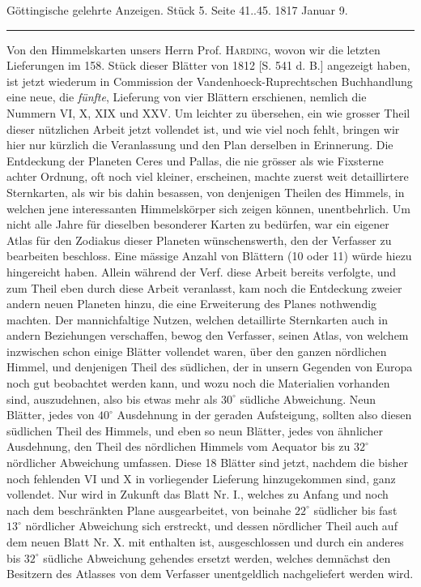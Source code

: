 \clearpage
{}
\hypertarget{native-598-lower}{}
\begin{center}\small Göttingische gelehrte Anzeigen. Stück 5. Seite 41..45. 1817 Januar 9.\\[3pt]\rule{.72\linewidth}{.3pt}\end{center}

Von den Himmelskarten unsers Herrn Prof. \textsc{Harding}, wovon wir die letzten Lieferungen im 158. Stück dieser Blätter von 1812 [S. 541 d. B.] angezeigt haben, ist jetzt wiederum in Commission der Vandenhoeck-Ruprechtschen Buchhandlung eine neue, die \emph{fünfte}, Lieferung von vier Blättern erschienen, nemlich die Nummern VI, X, XIX und XXV. Um leichter zu übersehen, ein wie grosser Theil dieser nützlichen Arbeit jetzt vollendet ist, und wie viel noch fehlt, bringen wir hier nur kürzlich die Veranlassung und den Plan derselben in Erinnerung. Die Entdeckung der Planeten Ceres und Pallas, die nie grösser als wie Fixsterne achter Ordnung, oft noch viel kleiner, erscheinen, machte zuerst weit detaillirtere Sternkarten, als wir bis dahin besassen, von denjenigen Theilen des Himmels, in welchen jene interessanten Himmelskörper sich zeigen können, unentbehrlich. Um nicht alle Jahre für dieselben besonderer Karten zu bedürfen, war ein eigener Atlas für den Zodiakus dieser Planeten wünschenswerth, den der Verfasser zu bearbeiten beschloss. Eine mässige Anzahl von Blättern (10 oder 11) würde hiezu hingereicht haben. Allein während der Verf. diese Arbeit bereits verfolgte, und zum Theil eben durch diese Arbeit veranlasst, kam noch die Entdeckung zweier andern neuen Planeten hinzu, die eine Erweiterung des Planes nothwendig machten. Der mannichfaltige Nutzen, welchen detaillirte Sternkarten auch in andern Beziehungen verschaffen, bewog den Verfasser, seinen Atlas, von welchem inzwischen schon einige Blätter vollendet waren, über den ganzen nördlichen Himmel, und denjenigen Theil des südlichen, der in unsern Gegenden von Europa noch gut beobachtet werden kann, und wozu noch die Materialien vorhanden sind, auszudehnen, also bis etwas mehr als $30^\circ$ südliche Abweichung. Neun Blätter, jedes von $40^\circ$ Ausdehnung in der geraden Aufsteigung, sollten also diesen südlichen Theil des Himmels, und eben so neun Blätter, jedes von ähnlicher Ausdehnung, den Theil des nördlichen Himmels vom Aequator bis zu $32^\circ$ nördlicher Abweichung umfassen. Diese 18 Blätter sind jetzt, nachdem die bisher noch fehlenden VI und X in vorliegender Lieferung hinzugekommen sind, ganz vollendet. Nur wird in Zukunft das Blatt Nr. I., welches zu Anfang und noch nach dem beschränkten Plane ausgearbeitet, von beinahe $22^\circ$ südlicher bis fast $13^\circ$ nördlicher Abweichung sich erstreckt, und dessen nördlicher Theil auch auf dem neuen Blatt Nr. X. mit enthalten ist, ausgeschlossen und durch ein anderes bis $32^\circ$ südliche Abweichung gehendes ersetzt werden, welches demnächst den Besitzern des Atlasses von dem Verfasser unentgeldlich nachgeliefert werden wird.

